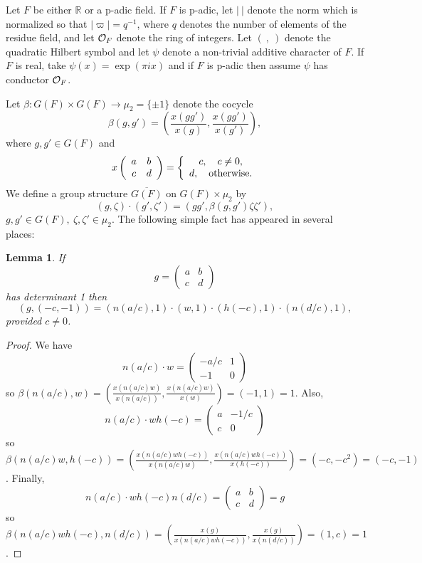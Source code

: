 \documentclass[12pt,letterpaper,openany]{book}
\theoremstyle{plain}
\newtheorem{lemma}[theorem]{Lemma}
\theoremstyle{definition}
\theoremstyle{remark}
\theoremstyle{remark}
\begin{document}
Let $F$ be either ${\mathbb{R}}$ or a p-adic field.
If $F$ is p-adic, let $|\ |$ denote the norm which is normalized
so that $|\varpi|=q^{-1}$, where $q$ denotes the number of elements of the
residue field, and let ${\cal O}_F$ denote the ring of integers.
Let $(\ ,\ )$ denote
the quadratic Hilbert symbol and let $\psi$ denote a non-trivial
additive character of $F$. If $F$ is real, take $\psi(x)=\exp(\pi ix)$
and if $F$ is p-adic then assume $\psi$ has conductor ${\cal O}_F$.

Let $\beta: G(F)\times G(F)\rightarrow \mu_2=\{\pm 1\}$
denote the cocycle
\[
\beta(g,g')=({\frac{x(gg')}{x(g)}}, {\frac{x(gg')}{x(g')}} ),
\]
where $g,g'\in G(F)$ and
\[
x\left(
\begin{array}{cc}
a & b \\
c & d
\end{array}
\right)
=
\left\{
    \begin{array}{c}
    c,\ \ \ c\not= 0,\\
    d,\ \ \ {\rm otherwise}.
    \end{array}
\right.
\]
We define a group structure $\overline{G(F)}$ on
$G(F)\times \mu_2$ by
\[
(g,\zeta)\cdot (g',\zeta')=(gg',\beta(g,g')\zeta\zeta'),
\]
$g,g'\in G(F),\ \zeta,\zeta'\in \mu_2$.
The following simple fact has appeared in several places:

\begin{lemma} If
\[
g=\left(
\begin{array}{cc}
a & b \\
c & d
\end{array}
\right)
\]
has determinant 1 then
\[
(g,(-c,-1))=(n(a/c),1)\cdot (w,1)\cdot (h(-c),1)\cdot (n(d/c),1),
\]
provided $c\not= 0$.
\end{lemma}

\begin{proof} We have
\[
n(a/c)\cdot w =
\left(
\begin{array}{cc}
-a/c & 1 \\
-1 & 0
\end{array}
\right)
\]
so $\beta(n(a/c),w)
=({\frac{x(n(a/c)w)}{x(n(a/c))}},{\frac{x(n(a/c)w)}{x(w)}})
=(-1,1)=1$.
Also,
\[
n(a/c)\cdot w h(-c) =
\left(
\begin{array}{cc}
a & -1/c \\
c & 0
\end{array}
\right)
\]
so $\beta(n(a/c)w,h(-c))
=({\frac{x(n(a/c)wh(-c))}{x(n(a/c)w)}},{\frac{x(n(a/c)wh(-c))}{x(h(-c))}})
=(-c,-c^2)=(-c,-1)$.
Finally,
\[
n(a/c)\cdot w h(-c)n(d/c) =
\left(
\begin{array}{cc}
a & b \\
c & d
\end{array}
\right)=g
\]
so $\beta(n(a/c)wh(-c),n(d/c))
=({\frac{x(g)}{x(n(a/c)wh(-c))}},{\frac{x(g)}{x(n(d/c))}})
=(1,c)=1$.
\end{proof}
\end{document}
